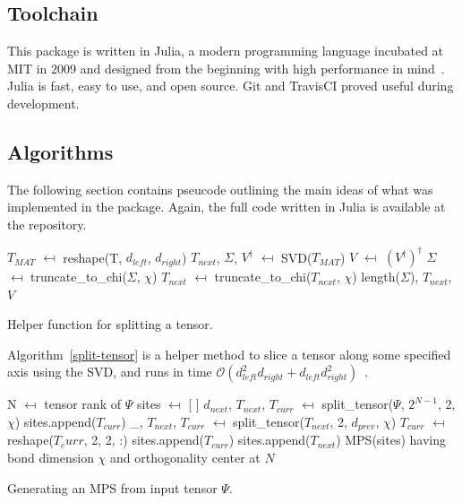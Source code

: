 \documentclass[12pt]{article}
\begin{document}
\begin{multicols}{2}
	\subsection{Toolchain}
	This package is written in Julia, a modern programming language incubated at MIT in 2009 and
	designed from the beginning with high performance in mind~\cite{Julia-lang}.
	Julia is fast, easy to use, and open source.
	Git and TravisCI proved useful during development.
	\subsection{Algorithms}
	The following section contains pseucode outlining the main ideas
	of what was implemented in the package. Again, the full code written
	in Julia is available at the repository.
	\begin{algorithm}[H]
		$T_{MAT}$ $\mapsfrom$ reshape(T, $d_{left}$, $d_{right}$)\;
		$T_{next}$, $\Sigma$, $V^\dagger$ $\mapsfrom$ SVD($T_{MAT}$)\;
		$V$ $\mapsfrom$ $(V^\dagger)^\dagger$\;
		$\Sigma$ $\mapsfrom$ truncate\_to\_chi($\Sigma$, $\chi$)\;
		$T_{next}$ $\mapsfrom$ truncate\_to\_chi($T_{next}$, $\chi$)\;
		\Return length($\Sigma$), $T_{next}$, $V$\;
		\caption{Helper function for splitting a tensor.}
		\label{split-tensor}
	\end{algorithm}
	Algorithm~\ref{split-tensor} is a helper method to slice a tensor along some specified axis using the SVD, and runs in time $\mathcal{O}(d_{left}^2d_{right}+d_{left}d_{right}^2)$~\cite{matrix-stuff}.
	\begin{algorithm}[H]
		N $\mapsfrom$ tensor rank of $\Psi$\;
		sites $\mapsfrom$ [ ]\;
		$d_{next}$, $T_{next}$, $T_{curr}$ $\mapsfrom$ split\_tensor($\Psi$, $2^{N-1}$, 2, $\chi$)\;
		sites.append($T_{curr}$)\;
		\_, $T_{next}$, $T_{curr}$ $\mapsfrom$ split\_tensor($T_{next}$, 2, $d_{prev}$, $\chi$)\;
		$T_{curr}$ $\mapsfrom$ reshape($T_curr$, 2, 2, :)\;
		sites.append($T_{curr}$)\;
		sites.append($T_{next}$)\;
		\Return MPS(sites) having bond dimension $\chi$ and orthogonality center at $N$\;
		\caption{Generating an MPS from input tensor $\Psi$.}
		\label{mps-gen}
	\end{algorithm}


\end{multicols}
\end{document}
